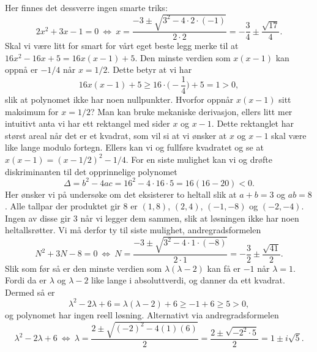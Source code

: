 \documentclass[a4paper,11pt]{article}
\begin{document}
\begin{solution}
    Her finnes det dessverre ingen smarte triks: 
    \begin{equation*}
        2x^2 + 3x - 1 = 0 \ \Leftrightarrow \
        x = \frac{-3 \pm \sqrt{3^2 - 4\cdot 2 \cdot (-1)}}{2\cdot 2}
          = - \frac{3}{4} \pm \frac{\sqrt{17}}{4}.
    \end{equation*}
    Skal vi være litt for smart for vårt eget beste legg merke til at 
    $16x^2 - 16x + 5 = 16x(x-1) + 5$. Den minste verdien som $x(x-1)$ kan oppnå
    er $-1/4$ når $x=1/2$. Dette betyr at vi har
    \begin{equation*}
        16x(x-1) + 5 \geq 16 \cdot \bigl( -\frac{1}{4}\bigr) + 5 = 1 > 0,
    \end{equation*}
    slik at polynomet ikke har noen nullpunkter. Hvorfor oppnår $x(x-1)$ sitt 
    maksimum for $x=1/2$? Man kan bruke mekaniske derivasjon, ellers litt mer 
    intuitivt anta vi har ett rektangel med sider $x$ og $x-1$. Dette rektanglet 
    har størst areal når det er et kvadrat, som vil si at vi ønsker at $x$ og 
    $x-1$ skal være like lange modulo fortegn. Ellers kan vi og fullføre 
    kvadratet og se at $x(x-1) = (x-1/2)^2 - 1/4$. For en siste mulighet kan 
    vi og drøfte diskriminanten til det opprinnelige polynomet
    \begin{equation}
        \Delta = b^2 - 4ac = 16^2 - 4 \cdot 16 \cdot 5 = 16 (16 - 20) < 0.
    \end{equation}
    \medskip
     Her ønsker vi på undersøke om det eksisterer
    to heltall slik at $a+b=3$ og $ab = 8$. Alle tallpar der produktet gir $8$ er $(1,8)$, $(2,4)$, $(-1,-8)$ og $(-2,-4)$. 
    Ingen av disse gir $3$ når vi legger dem sammen, slik at løsningen ikke har noen heltallsrøtter. 
    Vi må derfor ty til siste mulighet, andregradsformelen
    \begin{equation*}
        N^2 + 3N - 8 = 0
        \ \Leftrightarrow \ 
        N = \frac{-3 \pm \sqrt{3^2 - 4\cdot 1 \cdot (-8)}}{2\cdot 1}
          = -\frac{3}{2} \pm \frac{\sqrt{41}}{2}.
    \end{equation*}
    \medskip
     Slik som før
    så er den minste verdien som $\lambda(\lambda - 2)$ kan få er $-1$ når $\lambda = 1$. 
    Fordi da er $\lambda$ og $\lambda - 2$ like lange i absoluttverdi, og danner da ett kvadrat. Dermed så er 
    \begin{equation*}
        \lambda^2 - 2\lambda + 6 
        = \lambda(\lambda - 2) + 6
        \geq -1 + 6 \geq 5 > 0,
    \end{equation*}
    og polynomet har ingen reell løsning. Alternativt via andregradsformelen
    \begin{equation*}
        \lambda^2 - 2\lambda + 6 
        \ \Leftrightarrow \ 
        \lambda 
        = \frac{2 \pm \sqrt{(-2)^2 - 4(1)(6)}}{2}
        = \frac{2 \pm \sqrt{-2^2\cdot 5}}{2} 
        = 1 \pm i\sqrt{5}.
    \end{equation*}
\end{solution}
\end{document}
